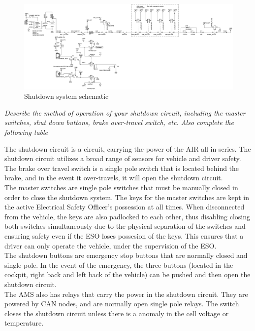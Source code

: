 \documentclass{article}
\begin{document}
        \begin{figure}
            \includegraphics[width=\textheight]{shutdownsystem}
            \caption{Shutdown system schematic}
            \label{shutdownschem}
        \end{figure}


\textit{Describe the method of operation of your shutdown circuit, including the master switches, shut down buttons, brake over-travel switch, etc. Also complete the following table}

The shutdown circuit is a circuit, carrying the power of the AIR all in series. The shutdown circuit utilizes a broad range of sensors for vehicle and driver safety.
The brake over travel switch is a single pole switch that is located behind the brake, and in the event it over-travels, it will open the shutdown circuit.\\

The master switches are single pole switches that must be manually closed in order to close the shutdown system. The keys for the master switches are kept in the active Electrical Safety Officer's possession at all times. When disconnected from the vehicle, the keys are also padlocked to each other, thus disabling closing both switches simultaneously due to the physical separation of the switches and ensuring safety even if the ESO loses possesion of the keys. This ensures that a driver can only operate the vehicle, under the supervision of the ESO.\\

The shutdown buttons are emergency stop buttons that are normally closed and single pole. In the event of the emergency, the three buttons (located in the cockpit, right back and left back of the vehicle) can be pushed and then open the shutdown circuit.\\

The AMS also has relays that carry the power in the shutdown circuit. They are powered by CAN nodes, and are normally open single pole relays. The switch closes the shutdown circuit unless there is a anomaly in the cell voltage or temperature.\\
\end{document}

